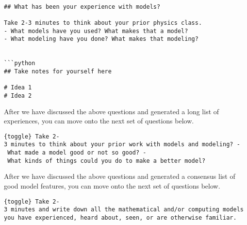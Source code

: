 \begin{verbatim}

## What has been your experience with models?

Take 2-3 minutes to think about your prior physics class.
- What models have you used? What makes that a model?
- What modeling have you done? What makes that modeling?


```python
## Take notes for yourself here

# Idea 1
# Idea 2
\end{verbatim}

After we have discussed the above questions and generated a long list of
experiences, you can move onto the next set of questions below.

\texttt{\{toggle\}\ Take\ 2-3\ minutes\ to\ think\ about\ your\ prior\ work\ with\ models\ and\ modeling?\ -\ What\ made\ a\ model\ good\ or\ not\ so\ good?\ -\ What\ kinds\ of\ things\ could\ you\ do\ to\ make\ a\ better\ model?}

\begin{Shaded}
\begin{Highlighting}[]

\end{Highlighting}
\end{Shaded}

After we have discussed the above questions and generated a consensus
list of good model features, you can move onto the next set of questions
below.

\texttt{\{toggle\}\ Take\ 2-3\ minutes\ and\ write\ down\ all\ the\ mathematical\ and/or\ computing\ models\ you\ have\ experienced,\ heard\ about,\ seen,\ or\ are\ otherwise\ familiar.}

\begin{Shaded}
\begin{Highlighting}[]

\end{Highlighting}
\end{Shaded}
